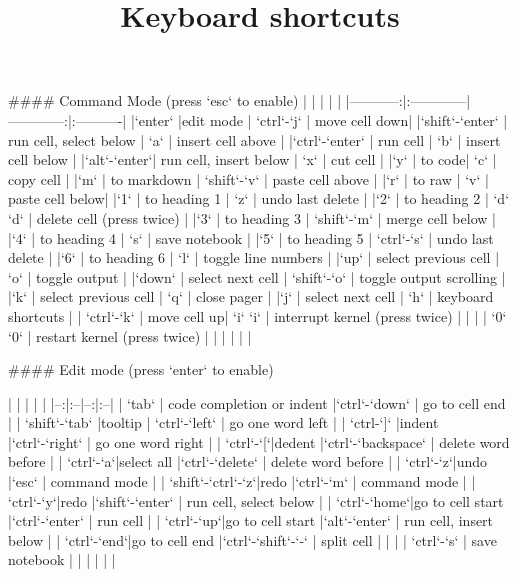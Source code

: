 \documentclass[letterpaper,12pt,oneside]{article}
\begin{document}
% 
\title{Keyboard shortcuts}

#### Command Mode (press `esc` to enable)
|  |  |  |  |
|-----------:|:------------|------------:|:----------|
|`enter` |edit mode | `ctrl`-`j` | move cell down|     
|`shift`-`enter` | run cell, select below | `a` | insert cell above |
|`ctrl`-`enter` | run cell | `b` | insert cell below |
|`alt`-`enter`| run cell, insert below | `x` | cut cell |
|`y` | to code| `c` | copy cell |
|`m` | to markdown | `shift`-`v` | paste cell above  |
|`r` | to raw | `v` | paste cell below|
|`1` | to heading 1 | `z` | undo last delete |
|`2` | to heading 2 | `d` `d` | delete cell (press twice) |
|`3` | to heading 3 | `shift`-`m` | merge cell below |
|`4` | to heading 4 | `s` | save notebook |
|`5` | to heading 5 | `ctrl`-`s` | undo last delete |
|`6` | to heading 6 | `l` | toggle line numbers |
|`up` | select previous cell | `o` | toggle output |
|`down` | select next cell | `shift`-`o` | toggle output scrolling |
|`k` | select previous cell | `q` | close pager |
|`j` | select next cell | `h` | keyboard shortcuts |
| `ctrl`-`k` | move cell up| `i` `i` | interrupt kernel (press twice) |
| | | `0` `0` | restart kernel (press twice) |   
| | |     |                               |    

#### Edit mode (press `enter` to enable)

| | | | |
|--:|:--|--:|:--|
| `tab` | code completion or indent |`ctrl`-`down` | go to cell end |
| `shift`-`tab` |tooltip | `ctrl`-`left` | go one word left |
| `ctrl-`]` |indent |`ctrl`-`right` | go one word right |
| `ctrl`-`[`|dedent |`ctrl`-`backspace` | delete word before |
| `ctrl`-`a`|select all |`ctrl`-`delete` | delete word before |
| `ctrl`-`z`|undo |`esc` | command mode |
| `shift`-`ctrl`-`z`|redo |`ctrl`-`m` | command mode |
| `ctrl`-`y`|redo |`shift`-`enter` | run cell, select below |
| `ctrl`-`home`|go to cell start |`ctrl`-`enter` | run cell |
| `ctrl`-`up`|go to cell start |`alt`-`enter` | run cell, insert below |
| `ctrl`-`end`|go to cell end |`ctrl`-`shift`-`-` | split cell |
| | | `ctrl`-`s` | save notebook |
|  |  |  |  |
\end{document}
